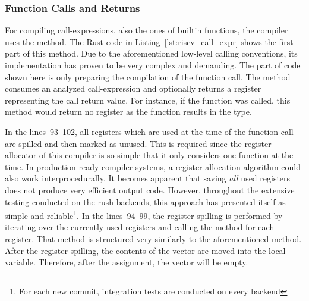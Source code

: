 \subsubsection{Function Calls and Returns}

For compiling call-expressions, also the ones of builtin functions, the compiler uses the  method.
The Rust code in Listing~\ref{lst:riscv_call_expr} shows the first part of this method.%
%
%
Due to the aforementioned low-level calling conventions,
its implementation has proven to be very complex and demanding.
The part of code shown here is only preparing the compilation of the function call.
The method consumes an analyzed call-expression and optionally returns a register representing the call return value.
For instance, if the  function was called, this method would return no register as the  function results in the \qVerb{!} type.

In the lines~93--102, all registers which are used at the time of the function call are spilled and then marked as unused.
This is required since the register allocator of this compiler is so simple that it only considers one function at the time.
In production-ready compiler systems, a register allocation algorithm could also work interprocedurally.
It becomes apparent that saving \emph{all} used registers does not produce very efficient output code.
However, throughout the extensive testing conducted on the rush backends, this approach has presented itself as simple and reliable\footnote{For each new commit, \rushCountTests integration tests are conducted on every backend}.
In the lines~94--99, the register spilling is performed by iterating over the currently used registers and calling the  method for each register.
That method is structured very similarly to the aforementioned  method.
After the register spilling, the contents of the  vector are moved into the local  variable.
Therefore, after the assignment, the  vector will be empty.

